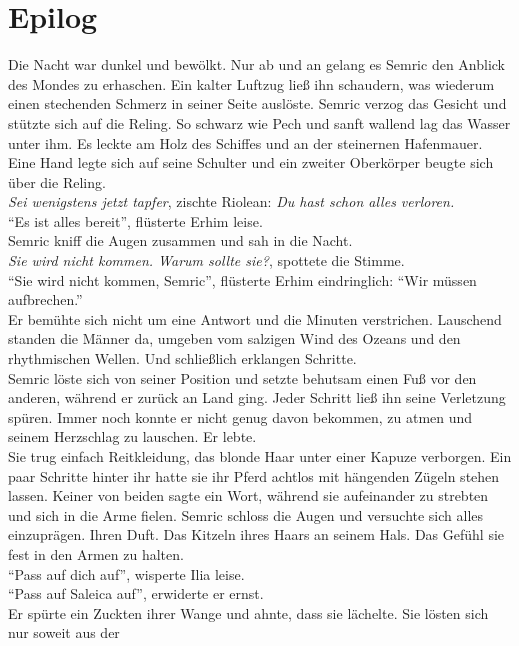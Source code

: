 \chapter{Epilog}

Die Nacht war dunkel und bewölkt. Nur ab und an gelang es Semric den Anblick des Mondes zu 
erhaschen. Ein kalter Luftzug ließ ihn schaudern, was wiederum einen stechenden Schmerz in seiner 
Seite auslöste. Semric verzog das Gesicht und stützte sich auf die Reling. So schwarz wie Pech und 
sanft wallend lag das Wasser unter ihm. Es leckte am Holz des Schiffes und an der steinernen 
Hafenmauer. Eine Hand legte sich auf seine Schulter und ein zweiter Oberkörper beugte sich über die 
Reling.\\
\textit{Sei wenigstens jetzt tapfer}, zischte Riolean: \textit{Du hast schon alles verloren.}\\
``Es ist alles bereit'', flüsterte Erhim leise.\\
Semric kniff die Augen zusammen und sah in die Nacht.\\
\textit{Sie wird nicht kommen. Warum sollte sie?}, spottete die Stimme.\\
``Sie wird nicht kommen, Semric'', flüsterte Erhim eindringlich: ``Wir müssen aufbrechen.''\\
Er bemühte sich nicht um eine Antwort und die Minuten verstrichen. Lauschend standen die Männer da, 
umgeben vom salzigen Wind des Ozeans und den rhythmischen Wellen. Und schließlich erklangen 
Schritte.\\
Semric löste sich von seiner Position und setzte behutsam einen Fuß vor den anderen, während er 
zurück an Land ging. Jeder Schritt ließ ihn seine Verletzung spüren. Immer noch konnte er nicht 
genug davon bekommen, zu atmen und seinem Herzschlag zu lauschen. Er lebte.\\
Sie trug einfach Reitkleidung, das blonde Haar unter einer Kapuze verborgen. Ein paar Schritte 
hinter ihr hatte sie ihr Pferd achtlos mit hängenden Zügeln stehen lassen. Keiner von beiden sagte 
ein Wort, während sie aufeinander zu strebten und sich in die Arme fielen. Semric schloss die Augen 
und versuchte sich alles einzuprägen. Ihren Duft. Das Kitzeln ihres Haars an seinem Hals. Das 
Gefühl sie fest in den Armen zu halten.\\
``Pass auf dich auf'', wisperte Ilia leise.\\
``Pass auf Saleica auf'', erwiderte er ernst.\\
Er spürte ein Zuckten ihrer Wange und ahnte, dass sie lächelte. Sie lösten sich nur soweit aus der 
